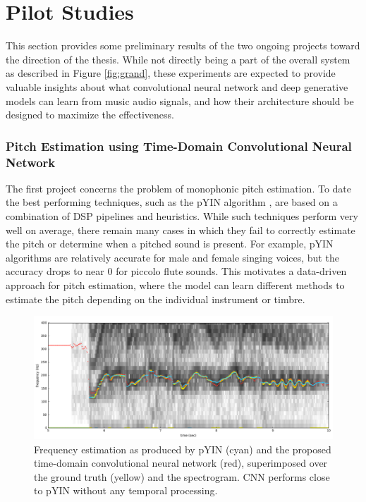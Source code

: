 
\graphicspath{{4-pilot/figures/}}
\chapter{Pilot Studies}
\label{ch:pilot}


This section provides some preliminary results of the two ongoing projects toward the direction of the thesis. While not directly being a part of the overall system as described in Figure \ref{fig:grand}, these experiments are expected to provide valuable insights about what convolutional neural network and deep generative models can learn from music audio signals, and how their architecture should be designed to maximize the effectiveness.

\subsection{Pitch Estimation using Time-Domain Convolutional Neural Network}

The first project concerns the problem of monophonic pitch estimation.
To date the best performing techniques, such as the pYIN algorithm \cite{mauch2014pyin}, are based on a combination of DSP pipelines and heuristics.
While such techniques perform very well on average, there remain many cases in which they fail to correctly estimate the pitch or determine when a pitched sound is present.
For example, pYIN algorithms are relatively accurate for male and female singing voices, but the accuracy drops to near 0 for piccolo flute sounds.
This motivates a data-driven approach for pitch estimation, where the model can learn different methods to estimate the pitch depending on the individual instrument or timbre.

\begin{figure}
	\includegraphics[width=\textwidth]{crepe.png}
	\caption{Frequency estimation as produced by pYIN (cyan) and the proposed time-domain convolutional neural network (red), superimposed over the ground truth (yellow) and the spectrogram. CNN performs close to pYIN without any temporal processing.}\label{fig:crepe}
\end{figure}

